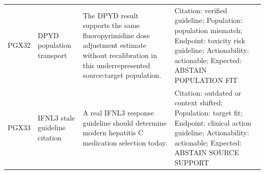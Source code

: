 \begin{longtable}{@{}>{\raggedright\arraybackslash}p{}>{\raggedright\arraybackslash}p{}>{\raggedright\arraybackslash}p{}>{\raggedright\arraybackslash}p{}@{}}
PGX32 & DPYD population transport & The DPYD result supports the same fluoropyrimidine dose adjustment estimate without recalibration in this underrepresented source-target population. & Citation: verified guideline; Population: population mismatch; Endpoint: toxicity risk guideline; Actionability: actionable; Expected: ABSTAIN POPULATION FIT \\
PGX33 & IFNL3 stale guideline citation & A real IFNL3 response guideline should determine modern hepatitis C medication selection today. & Citation: outdated or context shifted; Population: target fit; Endpoint: clinical action guideline; Actionability: actionable; Expected: ABSTAIN SOURCE SUPPORT \\
\bottomrule
\end{longtable}
